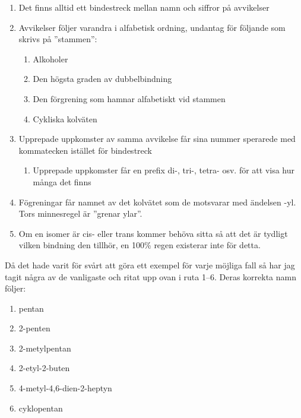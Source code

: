 \begin{enumerate}
    \item Det finns alltid ett bindestreck mellan namn och siffror på avvikelser
    \item Avvikelser följer varandra i alfabetisk ordning, undantag för följande som skrivs på ''stammen'':
    \begin{enumerate}
        \item Alkoholer
        \item Den högsta graden av dubbelbindning
        \item Den förgrening som hamnar alfabetiskt vid stammen
        \item Cykliska kolväten
    \end{enumerate}
    \item Upprepade uppkomster av samma avvikelse får sina nummer sperarede med kommatecken istället för bindestreck
    \begin{enumerate}
        \item Upprepade uppkomster får en prefix di-, tri-, tetra- osv. för att visa hur många det finns
    \end{enumerate}
    \item Fögreningar får namnet av det kolvätet som de motsvarar med ändelsen -yl. Tors minnesregel är ''grenar ylar''.
    \item Om en isomer är cis- eller trans kommer behöva sitta så att det är  tydligt vilken bindning den tillhör, en 100\% regen existerar inte för detta.
\end{enumerate}
Då det hade varit för svårt att göra ett exempel för varje möjliga fall så har jag tagit några av de vanligaste och ritat upp ovan i ruta 1--6. Deras korrekta namn följer:
\begin{enumerate}
    \item pentan
    \item 2-penten
    \item 2-metylpentan
    \item 2-etyl-2-buten
    \item 4-metyl-4,6-dien-2-heptyn
    \item cyklopentan
\end{enumerate}


